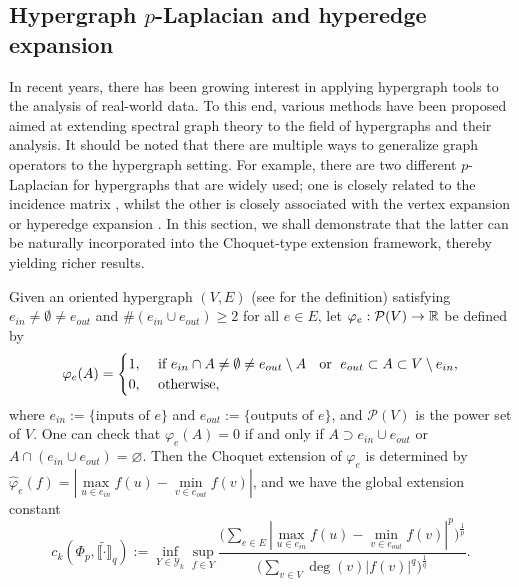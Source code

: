 \documentclass[12pt,a4paper]{article}
\begin{document}
\subsection{%
Hypergraph $p$-Laplacian and hyperedge expansion
}

In recent years, there has been growing interest in applying hypergraph tools to the analysis of real-world data. To this end, various methods have been proposed aimed at extending spectral graph theory to the field of hypergraphs and their analysis. 
It should be noted that there are multiple ways to generalize graph operators to the hypergraph setting. %
For example, there are two different $p$-Laplacian for hypergraphs that are widely used; %
one is closely related to the incidence matrix \cite{Stokke25,Fazeny24,JZ22}, whilst the other is closely associated with the vertex expansion or hyperedge expansion %
\cite{Chan18,Louis12}. 
In this section, we shall demonstrate that the latter can be naturally incorporated into the Choquet-type extension framework, %
thereby yielding richer results. 

Given an oriented hypergraph $(V,E)$ (see \cite{Jost/Mulas/Zhang26} for the definition) satisfying  $e_{in}\ne\emptyset\ne e_{out}$ and $\#(e_{in}\cup e_{out})\ge 2$ for all $e\in E$, let $\varphi_{e}:\mathcal{P}(V)\to \mathbb{R}$ be defined by
\begin{equation*}
\varphi_{e}(A)=\begin{cases}
1,&\text{ if } e_{in}\cap A\ne\emptyset\ne e_{out}\setminus A\text{ \; or\; }e_{out}\subset  A\subset V\setminus e_{in},\\
0,&\text{ otherwise},
\end{cases}
\end{equation*}
where $e_{in}:=\{\text{inputs of }e\}$ and  $e_{out}:=\{\text{outputs of }e\}$, and $\mathcal{P}(V)$ is the power set of $V$. 
One can check that $\varphi_e(A)=0$ if and only if $A\supset e_{in}\cup e_{out}$ or $A\cap(e_{in}\cup e_{out})=\varnothing$.
Then the Choquet extension of $\varphi_{e}$ is determined by 
$\widehat{\varphi}_{e}(f)=|\max\limits_{u\in e_{in}}f(u)-\min\limits_{v\in e_{out}}f(v)|$, and we have the global extension constant
$$ c_k(\Phi_p,\widetilde{\llbracket \cdot\rrbracket}_q):=\inf\limits_{Y\in \mathcal{Y}_k}\sup\limits_{f\in Y} \frac{\big(\sum_{e\in E}|\max\limits_{u\in e_{in}}f(u)-\min\limits_{v\in e_{out}}f(v)|^p\big)^{\frac1p}}{\big(\sum_{v\in V}\deg(v)|f(v)|^q\big)^{\frac1q}}.$$
\end{document}
